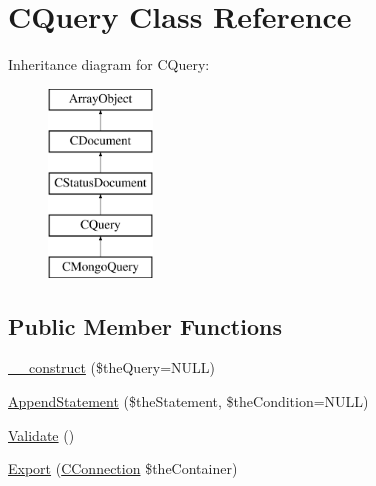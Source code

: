 \hypertarget{class_c_query}{\section{C\-Query Class Reference}
\label{class_c_query}
}
Inheritance diagram for C\-Query\-:\begin{figure}[H]
\begin{center}
\leavevmode
\includegraphics[height=5.000000cm]{class_c_query}
\end{center}
\end{figure}
\subsection*{Public Member Functions}
\begin{DoxyCompactItemize}
\item 
\hyperlink{class_c_query_a5f622c663cffb67955a528cac46502f9}{\-\_\-\-\_\-construct} (\$the\-Query=N\-U\-L\-L)
\item 
\hyperlink{class_c_query_ab18afa41c5060767efc493497f5f82f7}{Append\-Statement} (\$the\-Statement, \$the\-Condition=N\-U\-L\-L)
\item 
\hyperlink{class_c_query_a715ac553707078841213f7b874cbc48e}{Validate} ()
\item 
\hyperlink{class_c_query_a92324584013d5d0b1fd135443d271e19}{Export} (\hyperlink{class_c_connection}{C\-Connection} \$the\-Container)
\end{DoxyCompactItemize}
